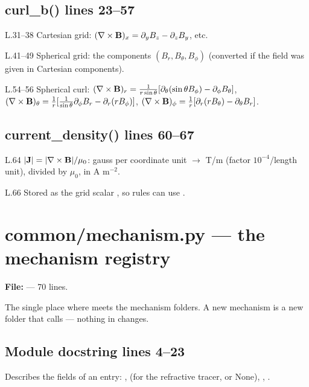 \section*{\normalsize curl\_b() \hfill{\small\mdseries\color{gray}lines 23--57}}

\begin{lines}
\item[L.31–38] Cartesian grid: $(\nabla\times\mathbf{B})_x=\partial_yB_z-\partial_zB_y$, etc.
\item[L.41–49] Spherical grid: the components $(B_r,B_\theta,B_\phi)$ (converted if the field was given in Cartesian components).
\item[L.54–56] Spherical curl: $(\nabla\times\mathbf{B})_r=\frac{1}{r\sin\theta}[\partial_\theta(\sin\theta B_\phi)-\partial_\phi B_\theta]$, $(\nabla\times\mathbf{B})_\theta=\frac1r[\frac{1}{\sin\theta}\partial_\phi B_r-\partial_r(rB_\phi)]$, $(\nabla\times\mathbf{B})_\phi=\frac1r[\partial_r(rB_\theta)-\partial_\theta B_r]$.
\end{lines}
\section*{\normalsize current\_density() \hfill{\small\mdseries\color{gray}lines 60--67}}

\begin{lines}
\item[L.64] $|\mathbf{J}|=|\nabla\times\mathbf{B}|/\mu_0$: gauss per coordinate unit $\to$ T/m (factor $10^{-4}$/length unit), divided by $\mu_0$, in A m$^{-2}$.
\item[L.66] Stored as the grid scalar , so rules can use .
\end{lines}

\chapter{common/mechanism.py --- the mechanism registry}
\label{mod:common:mechanism.py}
\textbf{File:}  --- 70 lines.

The single place where  meets the mechanism folders. A new mechanism is a
new folder that calls  --- nothing in  changes.

\section*{\normalsize Module docstring \hfill{\small\mdseries\color{gray}lines 4--23}}

Describes the fields of an entry: ,  (for the refractive tracer, or None), , .

